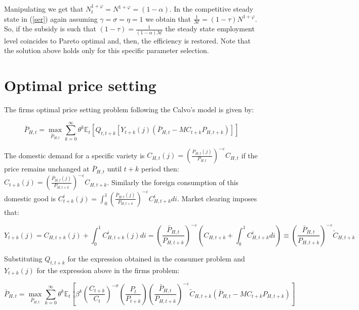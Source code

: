 \documentclass{article}
\newcommand{\Et}{\mathbb{E}_t}
\begin{document}
Manipulating we get that $N_t^{1+\varphi} = N^{1+\varphi} = (1-\alpha)$. In the competitive steady state in (\ref{ser}) again assuming $\gamma = \sigma = \eta = 1$ we obtain that $\frac{1}{\mathcal M} = (1-\tau) N^{1+\varphi}$. So, if the subsidy is such that $(1-\tau) = \frac{1}{(1-\alpha) \mathcal M}$ the steady state employment level coincides to Pareto optimal and, then, the efficiency is restored. Note that the solution above holds only for this specific parameter selection.

\section{Optimal price setting}
The firms optimal price setting problem following the Calvo's model is given by:

\begin{equation}
    \bar P_{H,t} = \max_{\bar P_{H,t}} \sum^\infty_{k=0} \theta^k \Et \left[ Q_{t, t+k}[Y_{t+k}(j) (\bar P_{H,t} - MC_{t+k} P_{H,t+k})] \right]
\end{equation}

The domestic demand for a specific variety is $C_{H,t}(j) = \left( \frac{P_{H,t}(j)}{P_{H,t}} \right)^{-\varepsilon} C_{H, t}$ if the price remains unchanged at $\bar P_{H,t}$ until $t+k$ period then: $C_{t+k}(j) = \left( \frac{\bar P_{H,t}(j)}{P_{H,t+k}}\right)^{-\varepsilon} C_{H, t+k}$. Similarly the foreign consumption of this domestic good is $C^i_{t+k}(j) = \int^1_0 \left( \frac{\bar P_{H,t}(j)}{P_{H,t+k}} \right)^{-\varepsilon} C^i_{H, t+k} di$. Market clearing imposes that:

\begin{equation}
    Y_{t+k}(j) = C_{H,t+k}(j) + \int_0^1 C^i_{H, t+k}(j) di = \left( \frac{\bar P_{H,t}}{P_{H,t+k}} \right)^{-\varepsilon} \left(C_{H,t+k} +  \int_0^1 C^i_{H, t+k} di \right) \equiv \left( \frac{\bar P_{H,t}}{P_{H,t+k}} \right)^{-\varepsilon} \tilde C_{H,t+k}
\end{equation}

Substituting $Q_{t, t+k}$ for the expression obtained in the consumer problem and $Y_{t+k}(j)$ for the expression above in the firms problem:

\begin{equation}
    \bar P_{H,t} = \max_{\bar P_{H,t}} \sum^\infty_{k=0} \theta^k \Et \left[ \beta^k \left( \frac{C_{t+k}}{C_t} \right)^{-\sigma} \left( \frac{P_{t}}{P_{t+k}} \right) \left( \frac{\bar P_{H,t}}{P_{H,t+k}} \right)^{-\varepsilon} \tilde C_{H,t+k} (\bar P_{H,t} - MC_{t+k} P_{H,t+k})  \right]
\end{equation}
\end{document}
